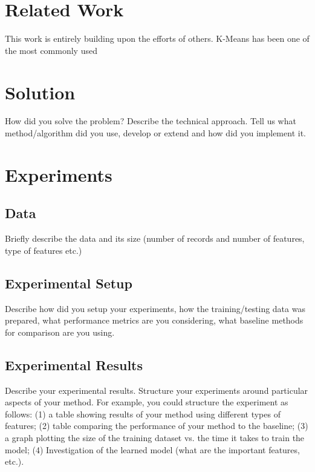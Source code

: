 \documentclass[letterpaper,12pt]{article}
\begin{document}
  \section{Related Work}

  This work is entirely building upon the efforts of others.
  K-Means\cite{macqueen1967} has been one of the most commonly used


  \section{Solution}

  How did you solve the problem? Describe the technical approach. Tell us
  what method/algorithm did you use, develop or extend and how did you
  implement it.


  \section{Experiments}

  \subsection{Data} Briefly describe the data and its size (number of
  records and number of features, type of features etc.)

  \subsection{Experimental Setup} Describe how did you setup your
  experiments, how the training/testing data was prepared, what performance
  metrics are you considering, what baseline methods for comparison are you
  using.

  \subsection{Experimental Results} Describe your experimental results.
  Structure your experiments around particular aspects of your method. For
  example, you could structure the experiment as follows: (1) a table
  showing results of your method using different types of features; (2)
  table comparing the performance of your method to the baseline; (3) a
  graph plotting the size of the training dataset vs. the time it takes to
  train the model; (4) Investigation of the learned model (what are the
  important features, etc.). \cite{santos2009}
\end{document}
